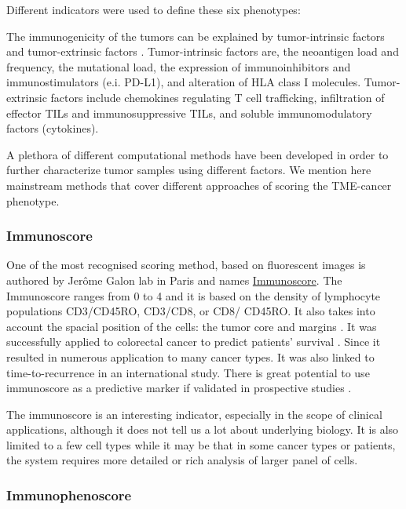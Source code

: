 \documentclass[12pt,]{book}
\theoremstyle{definition}
\theoremstyle{definition}
\theoremstyle{definition}
\theoremstyle{remark}
\begin{document}
Different indicators were used to define these six phenotypes:

The immunogenicity of the tumors can be explained by tumor-intrinsic
factors and tumor-extrinsic factors \citep{Gajewski2006}.
Tumor-intrinsic factors are, the neoantigen load and frequency, the
mutational load, the expression of immunoinhibitors and
immunostimulators (e.i. PD-L1), and alteration of HLA class I molecules.
Tumor-extrinsic factors include chemokines regulating T cell
trafficking, infiltration of effector TILs and immunosuppressive TILs,
and soluble immunomodulatory factors (cytokines).

A plethora of different computational methods have been developed in
order to further characterize tumor samples using different factors. We
mention here mainstream methods that cover different approaches of
scoring the TME-cancer phenotype.

\hypertarget{immunoscore}{%
\subsubsection{Immunoscore}\label{immunoscore}}

One of the most recognised scoring method, based on fluorescent images
is authored by Jerôme Galon lab in Paris and names
\href{http://www.haliodx.com/clinical-research-services/immunoscorer/}{Immunoscore}.
The Immunoscore ranges from 0 to 4 and it is based on the density of
lymphocyte populations CD3/CD45RO, CD3/CD8, or CD8/ CD45RO. It also
takes into account the spacial position of the cells: the tumor core and
margins \citep{Galon2012}. It was successfully applied to colorectal
cancer to predict patients' survival \citep{Anitei2014} . Since it
resulted in numerous application to many cancer types. It was also
linked to time-to-recurrence in an international study. There is great
potential to use immunoscore as a predictive marker if validated in
prospective studies \citep{Galon2016}.

The immunoscore is an interesting indicator, especially in the scope of
clinical applications, although it does not tell us a lot about
underlying biology. It is also limited to a few cell types while it may
be that in some cancer types or patients, the system requires more
detailed or rich analysis of larger panel of cells.

\hypertarget{immunophenoscore}{%
\subsubsection{Immunophenoscore}\label{immunophenoscore}}
\end{document}
